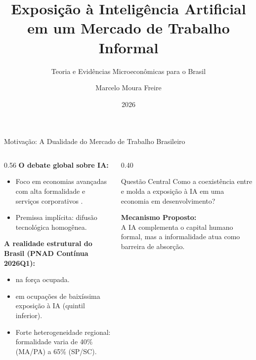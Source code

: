 \documentclass[aspectratio=169, 10pt]{beamer}
\title[Exposição à IA no Brasil]{Exposição à Inteligência Artificial em um Mercado de Trabalho Informal}
\subtitle{Teoria e Evidências Microeconômicas para o Brasil}
\author[Marcelo Moura Freire]{Marcelo Moura Freire}
\date{2026}
\begin{document}
\begin{frame}[plain]
    \titlepage
\end{frame}

\begin{frame}{Motivação: A Dualidade do Mercado de Trabalho Brasileiro}
    \begin{columns}[T]
        \begin{column}{0.56\textwidth}
            \textbf{O debate global sobre IA:}
            \begin{itemize}
                \item Foco em economias avançadas com alta formalidade
                e serviços corporativos \citep{eloundou2024gpts}.
                \item Premissa implícita: difusão tecnológica homogênea.
            \end{itemize}

            \vspace{0.3em}
            \textbf{A realidade estrutural do Brasil (PNAD Contínua 2026Q1):}
            \begin{itemize}
                \item {} na força ocupada.
                \item {} em ocupações
                de baixíssima exposição à IA (quintil inferior).
                \item Forte heterogeneidade regional: formalidade varia
                de 40\% (MA/PA) a 65\% (SP/SC).
            \end{itemize}
        \end{column}

        \begin{column}{0.40\textwidth}
            \begin{block}{Questão Central}
                Como a coexistência entre  e
                 molda a exposição à IA em
                uma economia em desenvolvimento?
            \end{block}

            \vspace{0.4em}
            \textbf{Mecanismo Proposto:} \\
            A IA complementa o capital humano formal, mas a
            informalidade atua como barreira de absorção.
        \end{column}
    \end{columns}
\end{frame}
\end{document}
